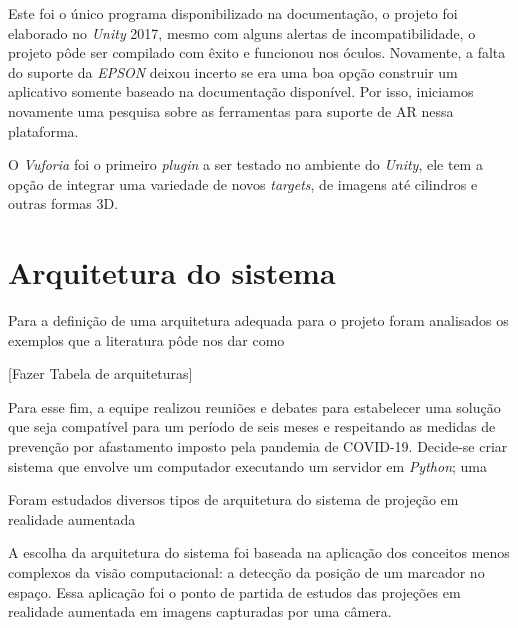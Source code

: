 Este foi o único programa disponibilizado na documentação, o projeto foi elaborado no \textit{Unity} 2017, mesmo com alguns alertas de incompatibilidade, o projeto pôde ser compilado com êxito e funcionou nos óculos. Novamente, a falta do suporte da \textit{EPSON} deixou incerto se era uma boa opção construir um aplicativo somente baseado na documentação disponível. Por isso, iniciamos novamente uma pesquisa sobre as ferramentas para suporte de AR nessa plataforma.

O \textit{Vuforia} foi o primeiro \textit{plugin} a ser testado no ambiente do \textit{Unity}, ele tem a opção de integrar uma variedade de novos \textit{targets}, de imagens até cilindros e outras formas 3D. 

\section{Arquitetura do sistema}

Para a definição de uma arquitetura adequada para o projeto foram analisados os exemplos que a literatura pôde nos dar como

[Fazer Tabela de arquiteturas]

Para esse fim, a equipe realizou reuniões e debates para estabelecer uma solução que seja compatível para um período de seis meses e respeitando as medidas de prevenção por afastamento imposto pela pandemia de COVID-19. Decide-se criar sistema que envolve um computador executando um servidor em \textit{Python}; uma 


Foram estudados diversos tipos de arquitetura do sistema de projeção em realidade aumentada

A escolha da arquitetura do sistema foi baseada na aplicação dos conceitos menos complexos da visão computacional: a detecção da posição de um marcador no espaço. Essa aplicação foi o ponto de partida de estudos das projeções em realidade aumentada em imagens capturadas por uma câmera.

